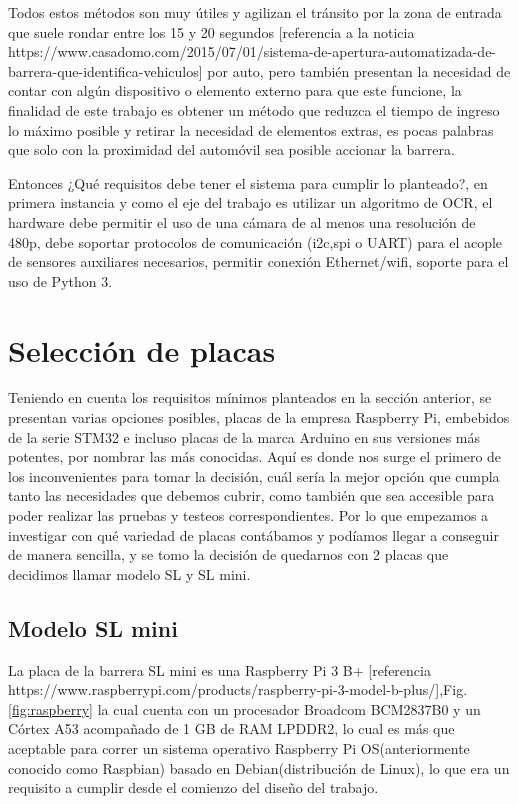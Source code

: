 Todos estos métodos son muy útiles y agilizan el tránsito por la zona de entrada que suele rondar entre los 15 y 20 segundos [referencia a la noticia https://www.casadomo.com/2015/07/01/sistema-de-apertura-automatizada-de-barrera-que-identifica-vehiculos] por
auto, pero también presentan la necesidad de contar con algún dispositivo o elemento externo para que este funcione, la finalidad
de este trabajo es obtener un método que reduzca el tiempo de ingreso lo máximo posible y retirar la necesidad de elementos
extras, es pocas palabras que solo con la proximidad del automóvil sea posible accionar la barrera.


Entonces ¿Qué requisitos debe tener el sistema para cumplir lo planteado?, en primera instancia y como el eje del trabajo
es utilizar un algoritmo de OCR, el hardware debe permitir el uso de una cámara de al menos una resolución de 480p, debe
soportar protocolos de comunicación (i2c,spi o UART) para el acople de sensores auxiliares necesarios, permitir conexión
Ethernet/wifi, soporte para el uso de Python 3.

\section{Selección de placas}
Teniendo en cuenta los requisitos mínimos planteados en la sección anterior, se presentan varias opciones posibles,
placas de la empresa Raspberry Pi, embebidos de la serie STM32 e incluso placas de la marca Arduino en sus versiones más
potentes, por nombrar las más conocidas. Aquí es donde nos surge el primero de los inconvenientes para tomar la decisión,
cuál sería la mejor opción que cumpla tanto las necesidades que debemos cubrir, como también que sea accesible para poder realizar las pruebas y testeos correspondientes.
Por lo que empezamos a investigar con qué variedad de placas contábamos y podíamos llegar a conseguir de manera sencilla,
y se tomo la decisión de quedarnos con 2 placas que decidimos llamar modelo SL y SL mini.

\subsection{Modelo SL mini}
La placa de la barrera SL mini es una Raspberry Pi 3 B+ [referencia https://www.raspberrypi.com/products/raspberry-pi-3-model-b-plus/],Fig.\ref{fig:raspberry} la cual cuenta con un procesador
Broadcom BCM2837B0 y un Córtex A53 acompañado de 1 GB de RAM LPDDR2, lo cual es más que aceptable para correr un sistema operativo Raspberry Pi
OS(anteriormente conocido como Raspbian) basado en Debian(distribución de Linux), lo que era un requisito a cumplir desde
el comienzo del diseño del trabajo.

